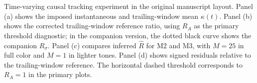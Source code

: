 \caption{Time-varying causal tracking experiment in the original manuscript layout. Panel (a) shows the imposed instantaneous and trailing-window mean $\kappa(t)$. Panel (b) shows the corrected trailing-window reference ratio, using $R_A$ as the primary threshold diagnostic; in the companion version, the dotted black curve shows the companion $R_\sigma$. Panel (c) compares inferred $\widehat R$ for M2 and M3, with $M=25$ in full color and $M=1$ in lighter tones. Panel (d) shows signed residuals relative to the trailing-window reference. The horizontal dashed threshold corresponds to $R_A=1$ in the primary plots.}